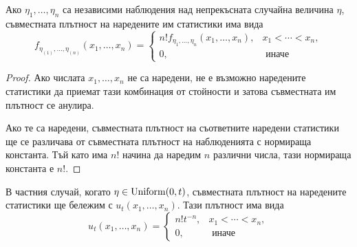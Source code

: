 \documentclass[numbers=endperiod, DIV=15, bibliography=totocnumbered]{scrartcl}
\begin{document}
\begin{proposition}
  Ако $\eta_1, \ldots, \eta_n$ са независими наблюдения над непрекъсната случайна величина $\eta$, съвместната плътност на наредените им статистики има вида
  \begin{displaymath}
    f_{\eta_{(1)}, \ldots, \eta_{(n)}} (x_1, \ldots, x_n)
    =
    \begin{cases}
      n! f_{\eta_{1}, \ldots, \eta_{n}} (x_1, \ldots, x_n), &x_1 < \cdots < x_n, \\
      0, &\text{ иначе}
    \end{cases}
  \end{displaymath}
\end{proposition}
\begin{proof}
  Ако числата $x_1, \ldots, x_n$ не са наредени, не е възможно наредените статистики да приемат тази комбинация от стойности и затова съвместната им плътност се анулира.

  Ако те са наредени, съвместната плътност на съответните наредени статистики ще се различава от съвместната плътност на наблюденията с нормираща константа. Тъй като има $n$! начина да наредим $n$ различни числа, тази нормираща константа е $n$!.
\end{proof}

\begin{note}
  В частния случай, когато $\eta \in \operatorname{Uniform}(0, t)$, съвместната плътност на наредените статистики ще бележим с $u_t(x_1, \ldots, x_n)$. Тази плътност има вида
  \begin{displaymath}
    u_t(x_1, \ldots, x_n)
    =
    \begin{cases}
      n! t^{-n}, &x_1 < \cdots < x_n, \\
      0, &\text{ иначе}
    \end{cases}
  \end{displaymath}
\end{note}
\end{document}
